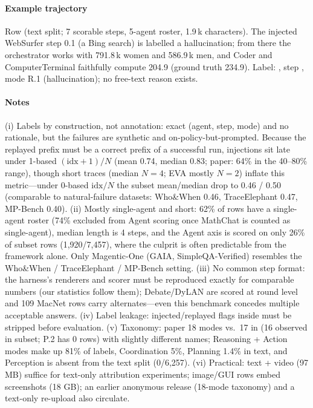 \paragraph{Example trajectory} Row  (text split; 7 scorable steps, 5-agent roster, 1.9\,k characters). The injected WebSurfer step 0.1 (a Bing search) is labelled a hallucination; from there the orchestrator works with 791.8\,k women and 586.9\,k men, and Coder and ComputerTerminal faithfully compute 204.9 (ground truth 234.9). Label: , step , mode R.1 (hallucination); no free-text reason exists.


\paragraph{Notes} (i) Labels by construction, not annotation: exact (agent, step, mode) and no rationale, but the failures are synthetic and on-policy-but-prompted. Because the replayed prefix must be a correct prefix of a successful run, injections sit late under 1-based $(\mathrm{idx}+1)/N$ (mean 0.74, median 0.83; paper: 64\% in the 40--80\% range), though short traces (median $N{=}4$; EVA mostly $N{=}2$) inflate this metric---under 0-based $\mathrm{idx}/N$ the subset mean/median drop to 0.46 / 0.50 (comparable to natural-failure datasets: Who\&When 0.46, TraceElephant 0.47, MP-Bench 0.40). (ii) Mostly single-agent and short: 62\% of rows have a single-agent roster (74\% excluded from Agent scoring once MathChat is counted as single-agent), median length is 4 steps, and the Agent axis is scored on only 26\% of subset rows (1,920/7,457), where the culprit is often predictable from the framework alone. Only Magentic-One (GAIA, SimpleQA-Verified) resembles the Who\&When / TraceElephant / MP-Bench setting. (iii) No common step format: the harness's renderers and scorer must be reproduced exactly for comparable numbers (our statistics follow them); Debate/DyLAN are scored at round level and 109 MacNet rows carry  alternates---even this benchmark concedes multiple acceptable answers. (iv) Label leakage: injected/replayed flags inside  must be stripped before evaluation. (v) Taxonomy: paper 18 modes vs.\ 17 in  (16 observed in subset; P.2 has 0 rows) with slightly different names; Reasoning + Action modes make up 81\% of labels, Coordination 5\%, Planning 1.4\% in text, and Perception is absent from the text split (0/6,257). (vi) Practical: text + video (97 MB) suffice for text-only attribution experiments; image/GUI rows embed screenshots (18 GB); an earlier anonymous release  (18-mode taxonomy) and a text-only re-upload also circulate.
